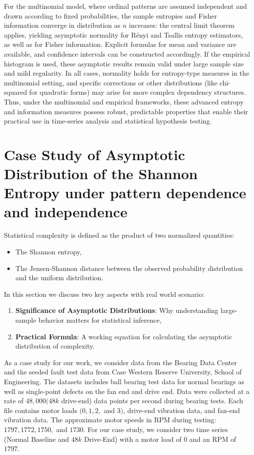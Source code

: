 For the multinomial model, where ordinal patterns are assumed independent and drawn according to fixed probabilities, the sample entropies and Fisher information converge in distribution as $n$ increases: the central limit theorem applies, yielding asymptotic normality for Rényi and Tsallis entropy estimators, as well as for Fisher information. Explicit formulas for mean and variance are available, and confidence intervals can be constructed accordingly. If the empirical histogram is used, these asymptotic results remain valid under large sample size and mild regularity. In all cases, normality holds for entropy-type measures in the multinomial setting, and specific corrections or other distributions (like chi-squared for quadratic forms) may arise for more complex dependency structures. Thus, under the multinomial and empirical frameworks, these advanced entropy and information measures possess robust, predictable properties that enable their practical use in time-series analysis and statistical hypothesis testing.


\section{Case Study of Asymptotic Distribution of the Shannon Entropy under pattern dependence and independence} \label{Sec:CaseStudy} 

Statistical complexity is defined as the product of two normalized quantities:
\begin{itemize}
	\item The Shannon entropy,
	\item The Jensen-Shannon distance between the observed probability distribution and the uniform distribution. 
\end{itemize}

In this section we discuss two key aspects with real world scenario:
\begin{enumerate}
	\item \textbf{Significance of Asymptotic Distributions}: Why understanding large-sample behavior matters for statistical inference,
	\item \textbf{Practical Formula}: A working equation for calculating the asymptotic distribution of complexity.
\end{enumerate}

As a case study for our work, we consider data from the Bearing Data Center and the seeded fault test data from Case Western Reserve University, School of Engineering. The datasets includes ball bearing test data for normal bearings as well as single-point defects on the fan end and drive end. Data were collected at a rate of $48,000 (48k$ drive-end) data points per second during bearing tests. Each file contains motor loads $(0, 1, 2,$ and $3)$, drive-end vibration data, and fan-end vibration data. The approximate motor speeds in RPM during testing: $1797, 1772, 1750,$ and $1730$. For our case study, we consider two time series (Normal Baseline and $48k$ Drive-End) with a motor load of $0$ and an RPM of $1797$. 

